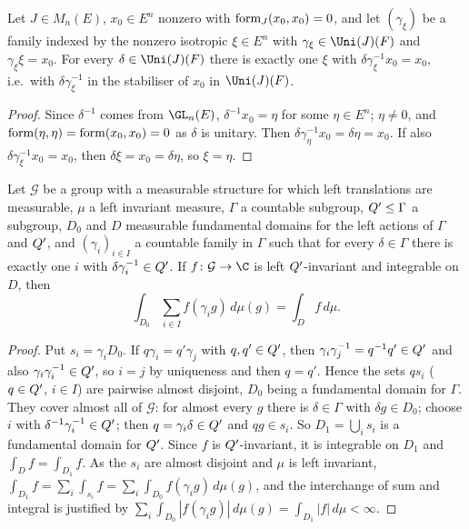 \begin{lemma}\label{pf:thmK-cone:coset}
Let $J\in M_n(E)$, $x_0\in E^n$ nonzero with $\operatorname{form}_J(x_0,x_0)=0$, and let $(\gamma_\xi)$ be a family indexed by
the nonzero isotropic $\xi\in E^n$ with $\gamma_\xi\in\Uni(J)(F)$ and $\gamma_\xi\xi=x_0$.  For every
$\delta\in\Uni(J)(F)$ there is exactly one $\xi$ with $\delta\gamma_\xi^{-1}x_0=x_0$, i.e.\ with
$\delta\gamma_\xi^{-1}$ in the stabiliser of $x_0$ in $\Uni(J)(F)$.
\end{lemma}

\begin{proof}
Since $\delta^{-1}$ comes from $\GL_n(E)$, $\delta^{-1}x_0=\eta$ for some $\eta\in E^n$; $\eta\neq0$, and
$\operatorname{form}(\eta,\eta)=\operatorname{form}(x_0,x_0)=0$ as $\delta$ is unitary.  Then $\delta\gamma_\eta^{-1}x_0=\delta\eta=
x_0$.  If also $\delta\gamma_\xi^{-1}x_0=x_0$, then $\delta\xi=x_0=\delta\eta$, so $\xi=\eta$.
\end{proof}

\begin{lemma}[Unfolding]\label{pf:thmK-cone:unfoldlemma}
Let $\mathcal G$ be a group with a measurable structure for which left translations are measurable, $\mu$ a
left invariant measure, $\Gamma$ a countable subgroup, $Q'\le\Gamma$ a subgroup, $D_0$ and $D$ measurable
fundamental domains for the left actions of $\Gamma$ and $Q'$, and $(\gamma_i)_{i\in I}$ a countable family in
$\Gamma$ such that for every $\delta\in\Gamma$ there is exactly one $i$ with $\delta\gamma_i^{-1}\in Q'$.  If
$f\colon\mathcal G\to\C$ is left $Q'$-invariant and integrable on $D$, then
\[
  \int_{D_0}\sum_{i\in I}f(\gamma_ig)\,d\mu(g)=\int_Df\,d\mu .
\]
\end{lemma}

\begin{proof}
Put $s_i=\gamma_iD_0$.  If $q\gamma_i=q'\gamma_j$ with $q,q'\in Q'$, then $\gamma_i\gamma_j^{-1}=q^{-1}q'\in
Q'$ and also $\gamma_i\gamma_i^{-1}\in Q'$, so $i=j$ by uniqueness and then $q=q'$.  Hence the
sets $qs_i$ ($q\in Q'$, $i\in I$) are pairwise almost disjoint, $D_0$ being a fundamental domain for $\Gamma$.
They cover almost all of $\mathcal G$: for almost every $g$ there is $\delta\in\Gamma$ with $\delta g\in D_0$; choose $i$
with $\delta^{-1}\gamma_i^{-1}\in Q'$; then $q=\gamma_i\delta\in Q'$ and $qg\in s_i$.  So
$D_1=\bigcup_is_i$ is a fundamental domain for $Q'$.  Since $f$ is $Q'$-invariant, it is
integrable on $D_1$ and $\int_Df=\int_{D_1}f$.  As the $s_i$ are almost disjoint and $\mu$ is left invariant,
$\int_{D_1}f=\sum_i\int_{s_i}f=\sum_i\int_{D_0}f(\gamma_ig)\,d\mu(g)$, and the interchange of sum and integral is
justified by $\sum_i\int_{D_0}|f(\gamma_ig)|\,d\mu(g)=\int_{D_1}|f|\,d\mu<\infty$.
\end{proof}


